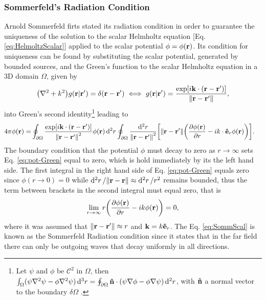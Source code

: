 


\subsubsection{Sommerfeld's Radiation Condition}

Arnold Sommerfeld firts stated its radiation condition in order to guarantee the uniqueness of the solution to the scalar Helmholtz equation [Eq. \eqref{eq:HelmoltzScalar}] applied to the scalar potential $\phi = \phi(\vb{r})$. Its condition for uniqueness can be found by substituting the scalar potential, generated by bounded sources, and the Green's function to the scalar Helmholtz equation in a 3D domain $\Omega$, given by \cite{zangwill_modern_2013,jackson_classical_1999}
%
\begin{align}
    \qty(\nabla^2 + k^2) g(\vb{r}|\vb{r}')   = \delta(\vb{r}-\vb{r}')  \iff
    g(\vb{r}|\vb{r}')   = \frac{\exp[i\vb{k}\cdot(\vb{r}-\vb{r}')]}{\norm{\vb{r}-\vb{r}'}},
\end{align}
%
into Green's second identity\footnote{%
        Let $\psi$ and $\phi$ be $\mathcal{C}^2$ in $\Omega$, then %
        $\int_\Omega (\psi\nabla^2\psi-\phi\nabla^2\psi)\dd[3]{r} = %
        \oint_{\partial\Omega}\vu{n}\cdot(\psi\nabla\phi-\phi\nabla\psi)\dd[2]{r}$, with $\vu{n}$ a normal vector to the boundary $\delta\Omega$  \cite{zangwill_modern_2013}.} %
 leading to
\begin{align}
    4\pi \phi(\vb{r}) =& \oint_{\partial\Omega}  \frac{\exp[i\vb{k}\cdot(\vb{r}-\vb{r}')]}{\norm{\vb{r}-\vb{r}'}^2} \phi(\vb{r}) \dd[2]{r}
                 \oint_{\partial\Omega} \frac{\dd[2]{r}}{\norm{\vb{r}-\vb{r}'}^2} \qty[\norm{\vb{r}-\vb{r}'}\qty(\pdv{ \phi(\vb{r})}{r}-ik\cdot\vu{e}_r \phi(\vb{r})) ].
    \label{eq:pot-Green}
\end{align}
%
The boundary condition that the potential $\phi$ must decay to zero as $r\to\infty$ sets Eq. \eqref{eq:pot-Green} equal to zero, which is  hold immediately by its the left hand side. The first integral in the right hand side of Eq. \eqref{eq:pot-Green} equals zero since $\phi(r\to 0 ) = 0$ while $\dd[2]{r}/\norm{\vb{r}-\vb{r}}\approx\dd[2]{r}/r^2$ remains bounded, thus the term between brackets in the second integral must equal zero, that is
%
\begin{align}
    \lim_{r\to \infty} r\qty(\pdv{\phi(\vb{r})}{r} - ik\phi(\vb{r})) = 0,
    \label{eq:SommScal}
\end{align}
%
where it was assumed that $\norm{\vb{r}-\vb{r}'} \approx r$ and $\vb{k} = k \vu{e}_r$. The Eq. \eqref{eq:SommScal} is known as the Sommerfeld Radiation condition since it states that in the far field there can only be outgoing waves that decay uniformly in all directions.

